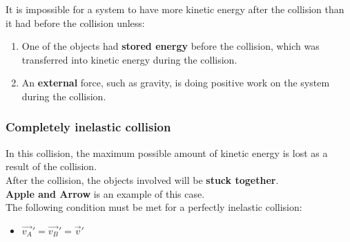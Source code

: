 It is impossible for a system to have more kinetic energy after the collision than it had before the collision unless:
\begin{enumerate}
    \item One of the objects had \textbf{stored energy} before the collision, which was transferred into kinetic energy during the collision. 
    \item An \textbf{external} force, such as gravity, is doing positive work on the system during the collision. 
\end{enumerate}

\subsubsection{Completely inelastic collision}
In this collision, the maximum possible amount of kinetic energy is lost as a result of the collision. \\

After the collision, the objects involved will be \textbf{stuck together}.\\

\textbf{Apple and Arrow} is an example of this case. \\

The following condition must be met for a perfectly inelastic collision:
\begin{itemize}
    \item $\vec{v_A}' = \vec{v_B}' = \vec{v}'$
\end{itemize}
